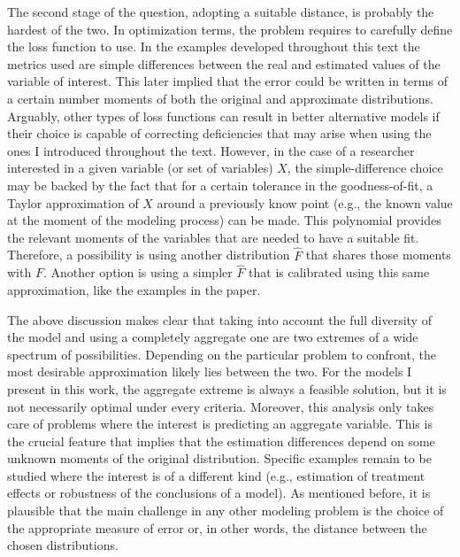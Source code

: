\documentclass[english, a4paper, 12pt]{article}
\begin{document}
The second stage of the question, adopting a suitable distance, is probably the hardest of the two. In optimization terms, the problem requires to carefully define the loss function to use. In the examples developed throughout this text the metrics used are simple differences between the real and estimated values of the variable of interest. This later implied that the error could be written in terms of a certain number moments of both the original and approximate distributions. Arguably, other types of loss functions can result in better alternative models if their choice is capable of correcting deficiencies that may arise when using the ones I introduced throughout the text. However, in the case of a researcher interested in a given variable (or set of variables) $X$, the simple-difference choice may be backed by the fact that for a certain tolerance in the goodness-of-fit, a Taylor approximation of $X$ around a previously know point (e.g., the known value at the moment of the modeling process) can be made. This polynomial provides the relevant moments of the variables that are needed to have a suitable fit. Therefore, a possibility is using another distribution $\hat{F}$ that shares those moments with $F$. Another option is using a simpler $\hat{F}$ that is calibrated using this same approximation, like the examples in the paper.

The above discussion makes clear that taking into account the full diversity of the model and using a completely aggregate one are two extremes of a wide spectrum of possibilities. Depending on the particular problem to confront, the most desirable approximation likely lies between the two. For the models I present in this work, the aggregate extreme is always a feasible solution, but it is not necessarily optimal under every criteria. Moreover, this analysis only takes care of problems where the interest is predicting an aggregate variable. This is the crucial feature that implies that the estimation differences depend on some unknown moments of the original distribution. Specific examples remain to be studied where the interest is of a different kind (e.g., estimation of treatment effects or robustness of the conclusions of a model). As mentioned before, it is plausible that the main challenge in any other modeling problem is the choice of the appropriate measure of error or, in other words, the distance between the chosen distributions. 
\end{document}
